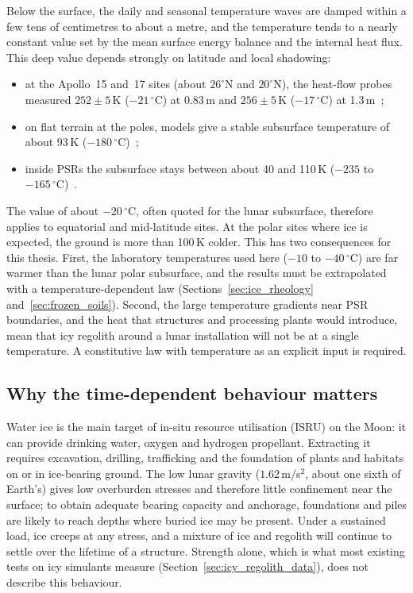 Below the surface, the daily and seasonal temperature waves are damped within a few tens of centimetres to about a metre, and the temperature tends to a nearly constant value set by the mean surface energy balance and the internal heat flux. This deep value depends strongly on latitude and local shadowing:
\begin{itemize}
    \item at the Apollo~15 and~17 sites (about $26^\circ$N and $20^\circ$N), the heat-flow probes measured $252\pm5$\,K ($-21\,^\circ$C) at 0.83\,m and $256\pm5$\,K ($-17\,^\circ$C) at 1.3\,m~\cite{langseth1976,hayne2017};
    \item on flat terrain at the poles, models give a stable subsurface temperature of about 93\,K ($-180\,^\circ$C)~\cite{vasavada1999};
    \item inside PSRs the subsurface stays between about 40 and 110\,K ($-235$ to $-165\,^\circ$C)~\cite{paige2010,williams2019}.
\end{itemize}
The value of about $-20\,^\circ$C, often quoted for the lunar subsurface, therefore applies to equatorial and mid-latitude sites. At the polar sites where ice is expected, the ground is more than 100\,K colder. This has two consequences for this thesis. First, the laboratory temperatures used here ($-10$ to $-40\,^\circ$C) are far warmer than the lunar polar subsurface, and the results must be extrapolated with a temperature-dependent law (Sections~\ref{sec:ice_rheology} and~\ref{sec:frozen_soils}). Second, the large temperature gradients near PSR boundaries, and the heat that structures and processing plants would introduce, mean that icy regolith around a lunar installation will not be at a single temperature. A constitutive law with temperature as an explicit input is required.

\subsection{Why the time-dependent behaviour matters}

Water ice is the main target of in-situ resource utilisation (ISRU) on the Moon: it can provide drinking water, oxygen and hydrogen propellant. Extracting it requires excavation, drilling, trafficking and the foundation of plants and habitats on or in ice-bearing ground. The low lunar gravity ($1.62$\,m/s$^2$, about one sixth of Earth's) gives low overburden stresses and therefore little confinement near the surface; to obtain adequate bearing capacity and anchorage, foundations and piles are likely to reach depths where buried ice may be present. Under a sustained load, ice creeps at any stress, and a mixture of ice and regolith will continue to settle over the lifetime of a structure. Strength alone, which is what most existing tests on icy simulants measure (Section~\ref{sec:icy_regolith_data}), does not describe this behaviour.

